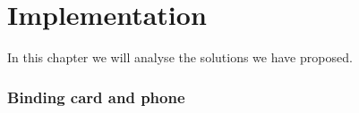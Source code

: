 \chapter{Implementation}
In this chapter we will analyse the solutions we have proposed. %

\subsection{Binding card and phone}
